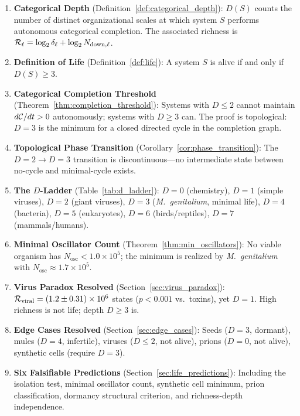 \begin{chapterbox}[title=Chapter 7 --- Key Results Established]
\begin{enumerate}[label=\textbf{\arabic*.}]

  \item \textbf{Categorical Depth} (Definition~\ref{def:categorical_depth}):
        $D(S)$ counts the number of distinct organizational scales at which
        system $S$ performs autonomous categorical completion. The associated
        richness is $\mathcal{R}_\ell = \log_2 \delta_\ell + \log_2 N_{\mathrm{down},\ell}$.

  \item \textbf{Definition of Life} (Definition~\ref{def:life}):
        A system $S$ is alive if and only if $D(S) \geq 3$.

  \item \textbf{Categorical Completion Threshold}
        (Theorem~\ref{thm:completion_threshold}): Systems with $D \leq 2$
        cannot maintain $d\mathcal{C}/dt > 0$ autonomously; systems with $D \geq 3$
        can. The proof is topological: $D = 3$ is the minimum for a closed
        directed cycle in the completion graph.

  \item \textbf{Topological Phase Transition}
        (Corollary~\ref{cor:phase_transition}): The $D = 2 \to D = 3$
        transition is discontinuous---no intermediate state between no-cycle
        and minimal-cycle exists.

  \item \textbf{The $D$-Ladder}
        (Table~\ref{tab:d_ladder}): $D = 0$ (chemistry), $D = 1$ (simple
        viruses), $D = 2$ (giant viruses), $D = 3$ (\textit{M.~genitalium},
        minimal life), $D = 4$ (bacteria), $D = 5$ (eukaryotes), $D = 6$
        (birds/reptiles), $D = 7$ (mammals/humans).

  \item \textbf{Minimal Oscillator Count}
        (Theorem~\ref{thm:min_oscillators}): No viable organism has
        $N_{\mathrm{osc}} < 1.0 \times 10^5$; the minimum is realized by
        \textit{M.~genitalium} with $N_{\mathrm{osc}} \approx 1.7 \times 10^5$.

  \item \textbf{Virus Paradox Resolved} (Section~\ref{sec:virus_paradox}):
        $\mathcal{R}_{\mathrm{viral}} = (1.2 \pm 0.31) \times 10^6$ states ($p <
        0.001$ vs.\ toxins), yet $D = 1$. High richness is not life;
        depth $D \geq 3$ is.

  \item \textbf{Edge Cases Resolved} (Section~\ref{sec:edge_cases}):
        Seeds ($D=3$, dormant), mules ($D=4$, infertile), viruses ($D\leq 2$,
        not alive), prions ($D=0$, not alive), synthetic cells (require $D=3$).

  \item \textbf{Six Falsifiable Predictions}
        (Section~\ref{sec:life_predictions}): Including the isolation test,
        minimal oscillator count, synthetic cell minimum, prion classification,
        dormancy structural criterion, and richness-depth independence.

\end{enumerate}
\end{chapterbox}
